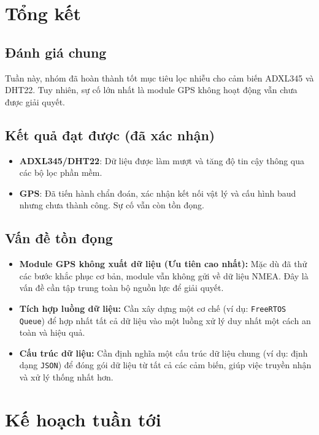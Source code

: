 \section{Tổng kết}

\subsection*{Đánh giá chung} Tuần này, nhóm đã hoàn thành tốt mục tiêu lọc nhiễu cho cảm biến ADXL345 và DHT22. Tuy nhiên, sự cố lớn nhất là module GPS không hoạt động vẫn chưa được giải quyết.

\subsection*{Kết quả đạt được (đã xác nhận)} 
\begin{itemize} 
\item \textbf{ADXL345/DHT22}: Dữ liệu được làm mượt và tăng độ tin cậy thông qua các bộ lọc phần mềm.
\item \textbf{GPS}: Đã tiến hành chẩn đoán, xác nhận kết nối vật lý và cấu hình baud nhưng chưa thành công. Sự cố vẫn còn tồn đọng. 
\end{itemize}

\subsection*{Vấn đề tồn đọng}
\begin{itemize}
    \item \textbf{Module GPS không xuất dữ liệu (Ưu tiên cao nhất):} 
    Mặc dù đã thử các bước khắc phục cơ bản, 
    module vẫn không gửi về dữ liệu NMEA. 
    Đây là vấn đề cần tập trung toàn bộ nguồn lực để giải quyết.

    \item \textbf{Tích hợp luồng dữ liệu:} 
    Cần xây dựng một cơ chế (ví dụ: \texttt{FreeRTOS Queue}) 
    để hợp nhất tất cả dữ liệu vào một luồng xử lý duy nhất 
    một cách an toàn và hiệu quả.

    \item \textbf{Cấu trúc dữ liệu:} 
    Cần định nghĩa một cấu trúc dữ liệu chung 
    (ví dụ: định dạng \texttt{JSON}) 
    để đóng gói dữ liệu từ tất cả các cảm biến, 
    giúp việc truyền nhận và xử lý thống nhất hơn.
\end{itemize}



\section{Kế hoạch tuần tới }

